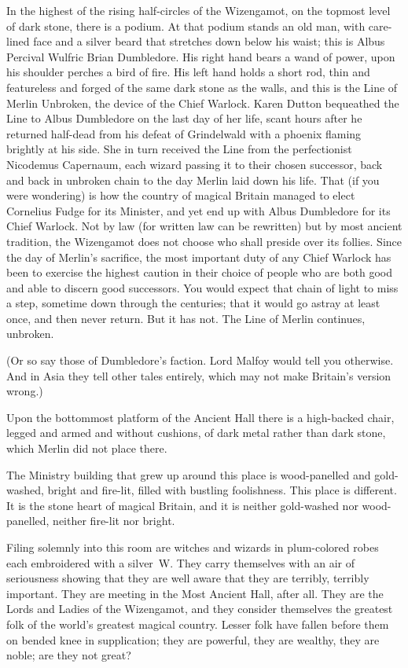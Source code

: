In the highest of the rising half-circles of the Wizengamot, on the topmost level of dark stone, there is a podium. At that podium stands an old man, with care-lined face and a silver beard that stretches down below his waist; this is Albus Percival Wulfric Brian Dumbledore. His right hand bears a wand of power, upon his shoulder perches a bird of fire. His left hand holds a short rod, thin and featureless and forged of the same dark stone as the walls, and this is the Line of Merlin Unbroken, the device of the Chief Warlock. Karen Dutton bequeathed the Line to Albus Dumbledore on the last day of her life, scant hours after he returned half-dead from his defeat of Grindelwald with a phoenix flaming brightly at his side. She in turn received the Line from the perfectionist Nicodemus Capernaum, each wizard passing it to their chosen successor, back and back in unbroken chain to the day Merlin laid down his life. That (if you were wondering) is how the country of magical Britain managed to elect Cornelius Fudge for its Minister, and yet end up with Albus Dumbledore for its Chief Warlock. Not by law (for written law can be rewritten) but by most ancient tradition, the Wizengamot does not choose who shall preside over its follies. Since the day of Merlin's sacrifice, the most important duty of any Chief Warlock has been to exercise the highest caution in their choice of people who are both good and able to discern good successors. You would expect that chain of light to miss a step, sometime down through the centuries; that it would go astray at least once, and then never return. But it has not. The Line of Merlin continues, unbroken.

(Or so say those of Dumbledore's faction. Lord Malfoy would tell you otherwise. And in Asia they tell other tales entirely, which may not make Britain's version wrong.)

Upon the bottommost platform of the Ancient Hall there is a high-backed chair, legged and armed and without cushions, of dark metal rather than dark stone, which Merlin did not place there.

The Ministry building that grew up around this place is wood-panelled and gold-washed, bright and fire-lit, filled with bustling foolishness. This place is different. It is the stone heart of magical Britain, and it is neither gold-washed nor wood-panelled, neither fire-lit nor bright.

Filing solemnly into this room are witches and wizards in plum-colored robes each embroidered with a silver~W\@. They carry themselves with an air of seriousness showing that they are well aware that they are terribly, terribly important. They are meeting in the Most Ancient Hall, after all. They are the Lords and Ladies of the Wizengamot, and they consider themselves the greatest folk of the world's greatest magical country. Lesser folk have fallen before them on bended knee in supplication; they are powerful, they are wealthy, they are noble; are they not great?

